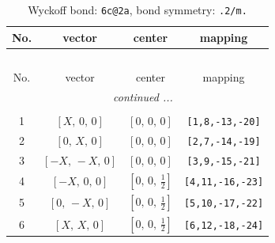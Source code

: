 \documentclass[fleqn,8pt]{jsarticle}
\begin{document}
\begin{longtable}{cccc}
\caption{Wyckoff bond: {\tt 6c@2a}, bond symmetry: {\tt .2/m.}}
 \\
 \hline \hline
No. & vector & center & mapping \\ \hline \endfirsthead

\multicolumn{3}{l}{\tablename\ \thetable{}} \\
 \hline \hline
No. & vector & center & mapping \\ \hline \endhead

 \hline \hline
\multicolumn{3}{r}{\footnotesize\it continued ...} \\ \endfoot

 \hline \hline
\multicolumn{3}{r}{} \\ \endlastfoot

1 & $\left[ X,\, 0,\, 0 \right]$ & $\left[ 0,\, 0,\, 0 \right]$ & {\tt [1,8,-13,-20]} \\ \hline
2 & $\left[ 0,\, X,\, 0 \right]$ & $\left[ 0,\, 0,\, 0 \right]$ & {\tt [2,7,-14,-19]} \\ \hline
3 & $\left[ - X,\, - X,\, 0 \right]$ & $\left[ 0,\, 0,\, 0 \right]$ & {\tt [3,9,-15,-21]} \\ \hline
4 & $\left[ - X,\, 0,\, 0 \right]$ & $\left[ 0,\, 0,\, \frac{1}{2} \right]$ & {\tt [4,11,-16,-23]} \\ \hline
5 & $\left[ 0,\, - X,\, 0 \right]$ & $\left[ 0,\, 0,\, \frac{1}{2} \right]$ & {\tt [5,10,-17,-22]} \\ \hline
6 & $\left[ X,\, X,\, 0 \right]$ & $\left[ 0,\, 0,\, \frac{1}{2} \right]$ & {\tt [6,12,-18,-24]} \\
\end{longtable}
\renewcommand{\arraystretch}{1.2}
\end{document}
